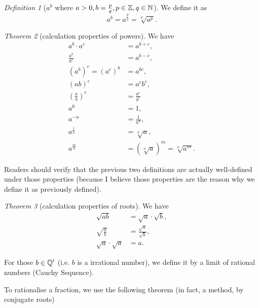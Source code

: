 \documentclass[8pt]{article}
\theoremstyle{remark}
\newtheorem{theorem}{Theorem}[section]
\newtheorem{definition}[theorem]{Definition}
\begin{document}
        \begin{definition}[$a^b$ where $a > 0, b = \frac{p}{q}, p \in \mathbb{Z}, q \in \mathbb{N}$]
            We define it as
            $$
                a^{b} = a^{\frac{p}{q}} = \sqrt[q]{a^p}.
            $$
        \end{definition}

        \begin{theorem}[calculation properties of powers]
            We have
            \begin{align*}
                a^b \cdot a^c &= a^{b + c},\\
                \frac{a^b}{a^c} &= a^{b - c},\\
                (a^b)^c = (a^c)^b &= a^{bc},\\
                (ab)^c &= a^c b^c,\\
                \left(\frac{a}{b}\right)^c &= \frac{a^c}{b^c}\\
                a^0 &= 1,\\
                a^{-n} &= \frac{1}{a^n},\\
                a^{\frac{1}{n}} &= \sqrt[n]{a},\\
                a^{\frac{m}{n}} &= \left(\sqrt[n]{a}\right)^m = \sqrt[n]{a^m}.
            \end{align*}

            Readers should verify that the previous two definitions are actually well-defined under those properties (because I believe those properties are the reason why we define it as previously defined).
        \end{theorem}

        \begin{theorem}[calculation properties of roots]
            We have
            \begin{align*}
                \sqrt{ab} &= \sqrt{a} \cdot \sqrt{b},\\
                \sqrt{\frac{a}{b}} &= \frac{\sqrt{a}}{\sqrt{b}},\\
                \sqrt{a} \cdot \sqrt{a} &= a.
            \end{align*}
        \end{theorem}

        For those $b \in \mathbb{Q}'$ (i.e. $b$ is a irrational number), we define it by a limit of rational numbers (Cauchy Sequence).

        To rationalise a fraction, we use the following theorem (in fact, a method, by conjugate roots)
        
\end{document}
